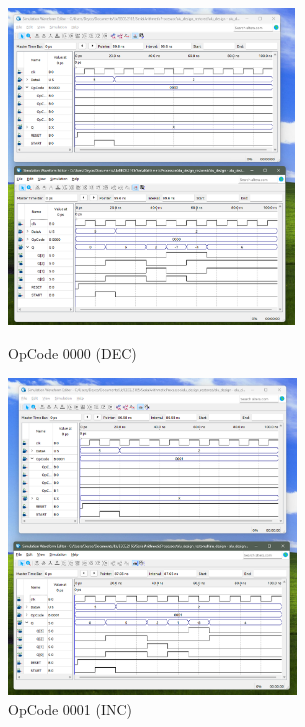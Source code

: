 \documentclass[11pt,a4paper,english]{article}
\begin{document}
  \begin{figure}[h]
    \begin{minipage}[c]{0.4\linewidth}
    \centering
    \includegraphics[height=84mm]{./ss/p4_dec(0000).png}
    \caption{OpCode 0000 (DEC)}
    \end{minipage}
    \hspace*{50pt}
    \begin{minipage}[c]{0.4\linewidth}
    \centering
    \includegraphics[height=84mm]{./ss/p4_inc(0001).png}
    \caption{OpCode 0001 (INC)}
    \end{minipage}%
    \end{figure}
    
\end{document}
